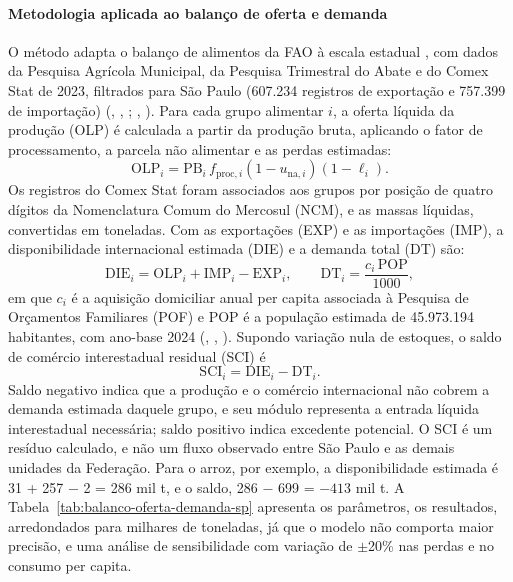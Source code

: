 \documentclass[
	12pt,				%
	openright,			%
	oneside,			%
	a4paper,			%
	chapter=TITLE,		%
	section=TITLE,		%
	english,			%
	french,				%
	spanish,			%
	brazil,				%
 ]{abntex2}
\begin{document}
\paragraph{Metodologia aplicada ao balanço de oferta e demanda}
O método adapta o balanço de alimentos da FAO à escala estadual
\cite{fao_food_balance_2001}, com dados da Pesquisa Agrícola Municipal, da
Pesquisa Trimestral do Abate e do Comex Stat de 2023, filtrados para São Paulo
(607.234 registros de exportação e 757.399 de importação)
(\citeauthor{ibge_pam_2023}, \citeyear{ibge_pam_2023}, \citeyear{ibge_abate_2023}; \citeauthor{mdic_comexstat_2023}, \citeyear{mdic_comexstat_2023}). Para cada grupo
alimentar $i$, a oferta líquida da produção (OLP) é calculada a partir da
produção bruta, aplicando o fator de processamento, a parcela não alimentar e
as perdas estimadas:
\[
\mathrm{OLP}_{i}=\mathrm{PB}_{i}\,f_{\mathrm{proc},i}
(1-u_{\mathrm{na},i})(1-\ell_i).
\]
Os registros do Comex Stat foram associados aos grupos por posição de quatro dígitos da Nomenclatura Comum do Mercosul
(NCM), e as massas líquidas, convertidas em toneladas. Com as
exportações (EXP) e as importações (IMP), a disponibilidade internacional
estimada (DIE) e a demanda total (DT) são:
\[
\mathrm{DIE}_{i}=\mathrm{OLP}_{i}+\mathrm{IMP}_{i}-\mathrm{EXP}_{i},
\qquad
\mathrm{DT}_{i}=\frac{c_i\,\mathrm{POP}}{1000},
\]
em que $c_i$ é a aquisição domiciliar anual per capita associada à Pesquisa de
Orçamentos Familiares (POF) e POP é
a população estimada de 45.973.194 habitantes, com ano-base 2024
(\citeauthor{ibge_pof_2018}, \citeyear{ibge_pof_2018}, \citeyear{ibge_pnadc_2023}). Supondo variação nula de estoques, o saldo
de comércio interestadual residual (SCI) é
\[
\mathrm{SCI}_{i}=\mathrm{DIE}_{i}-\mathrm{DT}_{i}.
\]
Saldo negativo indica que a produção e o comércio internacional não cobrem a
demanda estimada daquele grupo, e seu módulo representa a entrada líquida
interestadual necessária; saldo positivo indica excedente potencial. O SCI é um
resíduo calculado, e não um fluxo observado entre São Paulo e as demais
unidades da Federação. Para o arroz, por exemplo, a disponibilidade estimada é
31 + 257 $-$ 2 = 286 mil t, e o saldo, 286 $-$ 699 = $-413$ mil t. A
Tabela~\ref{tab:balanco-oferta-demanda-sp} apresenta os parâmetros, os
resultados, arredondados para milhares de toneladas, já que o modelo não
comporta maior precisão, e uma análise de sensibilidade com variação de
$\pm$20\% nas perdas e no consumo per capita.
\end{document}

